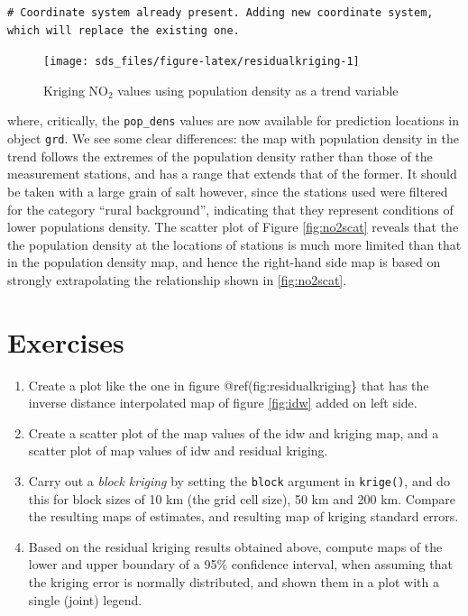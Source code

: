 \documentclass[]{book}
\providecommand{\tightlist}{%
  \setlength{\itemsep}{0pt}\setlength{\parskip}{0pt}}
\begin{document}
\begin{verbatim}
# Coordinate system already present. Adding new coordinate system, which will replace the existing one.
\end{verbatim}

\begin{figure}

{\centering \texttt{[image: sds\_files/figure-latex/residualkriging-1]} 

}

\caption{Kriging NO\(_2\) values using population density as a trend variable}\label{fig:residualkriging}
\end{figure}

where, critically, the \texttt{pop\_dens} values are now available for
prediction locations in object \texttt{grd}. We see some clear differences:
the map with population density in the trend follows the extremes of
the population density rather than those of the measurement stations,
and has a range that extends that of the former. It should be taken
with a large grain of salt however, since the stations used were
filtered for the category ``rural background'', indicating that they
represent conditions of lower populations density. The scatter plot
of Figure \ref{fig:no2scat} reveals that the the population density
at the locations of stations is much more limited than that in the
population density map, and hence the right-hand side map is based on
strongly extrapolating the relationship shown in \ref{fig:no2scat}.

\hypertarget{exercises-10}{%
\section{Exercises}\label{exercises-10}}

\begin{enumerate}
\def\labelenumi{\arabic{enumi}.}
\tightlist
\item
  Create a plot like the one in figure @ref(fig:residualkriging\}
  that has the inverse distance interpolated map of figure
  \ref{fig:idw} added on left side.
\item
  Create a scatter plot of the map values of the idw and kriging
  map, and a scatter plot of map values of idw and residual kriging.
\item
  Carry out a \emph{block kriging} by setting the \texttt{block} argument in
  \texttt{krige()}, and do this for block sizes of 10 km (the grid cell size),
  50 km and 200 km. Compare the resulting maps of estimates, and
  resulting map of kriging standard errors.
\item
  Based on the residual kriging results obtained above, compute
  maps of the lower and upper boundary of a 95\% confidence interval,
  when assuming that the kriging error is normally distributed,
  and shown them in a plot with a single (joint) legend.
\end{enumerate}
\end{document}
